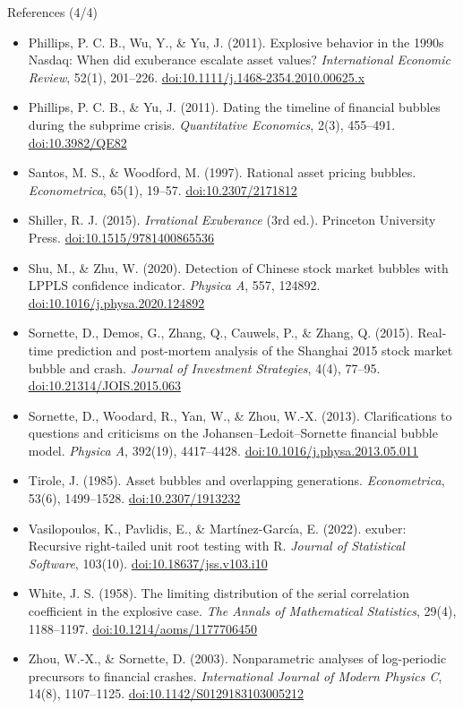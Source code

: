 \begin{frame}{References (4/4)}
\itemsize{\tiny}
\begin{itemize}
    \item Phillips, P. C. B., Wu, Y., \& Yu, J. (2011). Explosive behavior in the 1990s Nasdaq: When did exuberance escalate asset values? \textit{International Economic Review}, 52(1), 201--226. \href{https://doi.org/10.1111/j.1468-2354.2010.00625.x}{doi:10.1111/j.1468-2354.2010.00625.x}
    \item Phillips, P. C. B., \& Yu, J. (2011). Dating the timeline of financial bubbles during the subprime crisis. \textit{Quantitative Economics}, 2(3), 455--491. \href{https://doi.org/10.3982/QE82}{doi:10.3982/QE82}
    \item Santos, M. S., \& Woodford, M. (1997). Rational asset pricing bubbles. \textit{Econometrica}, 65(1), 19--57. \href{https://doi.org/10.2307/2171812}{doi:10.2307/2171812}
    \item Shiller, R. J. (2015). \textit{Irrational Exuberance} (3rd ed.). Princeton University Press. \href{https://doi.org/10.1515/9781400865536}{doi:10.1515/9781400865536}
    \item Shu, M., \& Zhu, W. (2020). Detection of Chinese stock market bubbles with LPPLS confidence indicator. \textit{Physica A}, 557, 124892. \href{https://doi.org/10.1016/j.physa.2020.124892}{doi:10.1016/j.physa.2020.124892}
    \item Sornette, D., Demos, G., Zhang, Q., Cauwels, P., \& Zhang, Q. (2015). Real-time prediction and post-mortem analysis of the Shanghai 2015 stock market bubble and crash. \textit{Journal of Investment Strategies}, 4(4), 77--95. \href{https://doi.org/10.21314/JOIS.2015.063}{doi:10.21314/JOIS.2015.063}
    \item Sornette, D., Woodard, R., Yan, W., \& Zhou, W.-X. (2013). Clarifications to questions and criticisms on the Johansen--Ledoit--Sornette financial bubble model. \textit{Physica A}, 392(19), 4417--4428. \href{https://doi.org/10.1016/j.physa.2013.05.011}{doi:10.1016/j.physa.2013.05.011}
    \item Tirole, J. (1985). Asset bubbles and overlapping generations. \textit{Econometrica}, 53(6), 1499--1528. \href{https://doi.org/10.2307/1913232}{doi:10.2307/1913232}
    \item Vasilopoulos, K., Pavlidis, E., \& Martínez-García, E. (2022). exuber: Recursive right-tailed unit root testing with R. \textit{Journal of Statistical Software}, 103(10). \href{https://doi.org/10.18637/jss.v103.i10}{doi:10.18637/jss.v103.i10}
    \item White, J. S. (1958). The limiting distribution of the serial correlation coefficient in the explosive case. \textit{The Annals of Mathematical Statistics}, 29(4), 1188--1197. \href{https://doi.org/10.1214/aoms/1177706450}{doi:10.1214/aoms/1177706450}
    \item Zhou, W.-X., \& Sornette, D. (2003). Nonparametric analyses of log-periodic precursors to financial crashes. \textit{International Journal of Modern Physics C}, 14(8), 1107--1125. \href{https://doi.org/10.1142/S0129183103005212}{doi:10.1142/S0129183103005212}
\end{itemize}
\end{frame}


